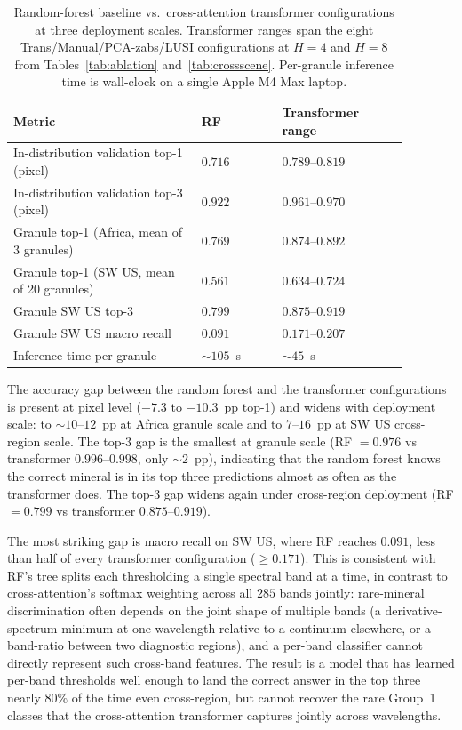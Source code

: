 \documentclass[preprint,12pt]{elsarticle}
\begin{document}
\begin{table}[!htbp]
\centering
\small
\caption{Random-forest baseline vs.\ cross-attention transformer configurations at three deployment scales. Transformer ranges span the eight Trans/Manual/PCA-zabs/LUSI configurations at $H = 4$ and $H = 8$ from Tables~\ref{tab:ablation} and~\ref{tab:crossscene}. Per-granule inference time is wall-clock on a single Apple M4 Max laptop.}
\label{tab:rf_compare}
\begin{tabular}{p{0.42\linewidth}p{0.18\linewidth}p{0.28\linewidth}}
\hline
\rowcolor[gray]{0.85}
\textbf{Metric} & \textbf{RF} & \textbf{Transformer range} \\
\hline
In-distribution validation top-1 (pixel)         & $0.716$        & $0.789$--$0.819$ \\
\hline
In-distribution validation top-3 (pixel)         & $0.922$        & $0.961$--$0.970$ \\
\hline
Granule top-1 (Africa, mean of 3 granules)       & $0.769$        & $0.874$--$0.892$ \\
\hline
Granule top-1 (SW US, mean of 20 granules)       & $0.561$        & $0.634$--$0.724$ \\
\hline
Granule SW US top-3                              & $0.799$        & $0.875$--$0.919$ \\
\hline
Granule SW US macro recall                       & $0.091$        & $0.171$--$0.207$ \\
\hline
Inference time per granule                       & $\sim$$105$~s  & $\sim$$45$~s     \\
\hline
\end{tabular}
\end{table}

The accuracy gap between the random forest and the transformer configurations is present at pixel level ($-7.3$ to $-10.3$~pp top-1) and widens with deployment scale: to $\sim$$10$--$12$~pp at Africa granule scale and to $7$--$16$~pp at SW US cross-region scale. The top-3 gap is the smallest at granule scale (RF $= 0.976$ vs transformer $0.996$--$0.998$, only $\sim$$2$~pp), indicating that the random forest knows the correct mineral is in its top three predictions almost as often as the transformer does. The top-3 gap widens again under cross-region deployment (RF $= 0.799$ vs transformer $0.875$--$0.919$).

The most striking gap is macro recall on SW US, where RF reaches $0.091$, less than half of every transformer configuration ($\geq 0.171$). This is consistent with RF's tree splits each thresholding a single spectral band at a time, in contrast to cross-attention's softmax weighting across all $285$ bands jointly: rare-mineral discrimination often depends on the joint shape of multiple bands (a derivative-spectrum minimum at one wavelength relative to a continuum elsewhere, or a band-ratio between two diagnostic regions), and a per-band classifier cannot directly represent such cross-band features. The result is a model that has learned per-band thresholds well enough to land the correct answer in the top three nearly $80\%$ of the time even cross-region, but cannot recover the rare Group~1 classes that the cross-attention transformer captures jointly across wavelengths.
\end{document}
